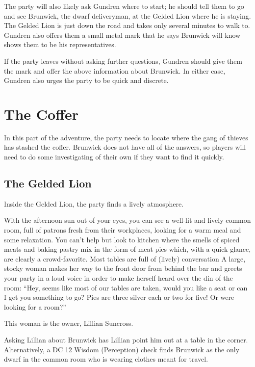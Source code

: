 \documentclass[10pt,twocolumn,openany,nodeprecatedcode,bg=none,inline]{dndbook}
\begin{document}
The party will also likely ask Gundren where to start; he should tell them to go and see Brunwick, the dwarf deliveryman, at the Gelded Lion where he is staying.
The Gelded Lion is just down the road and takes only several minutes to walk to.
Gundren also offers them a small metal mark that he says Brunwick will know shows them to be his representatives.

If the party leaves without asking further questions, Gundren should give them the mark and offer the above information about Brunwick.
In either case, Gundren also urges the party to be quick and discrete.

\chapter{The Coffer}
In this part of the adventure, the party needs to locate where the gang of thieves has stashed the coffer.
Brunwick does not have all of the answers, so players will need to do some investigating of their own if they want to find it quickly.

\section{The Gelded Lion}
Inside the Gelded Lion, the party finds a lively atmosphere.
\begin{DndReadAloud}
  With the afternoon sun out of your eyes, you can see a well-lit and lively common room, full of patrons fresh from their workplaces, looking for a warm meal and some relaxation.
  You can't help but look to kitchen where the smells of spiced meats and baking pastry mix in the form of meat pies which, with a quick glance, are clearly a crowd-favorite.
  Most tables are full of (lively) conversation
  A large, stocky woman makes her way to the front door from behind the bar and greets your party in a loud voice in order to make herself heard over the din of the room:
  ``Hey, seems like most of our tables are taken, would you like a seat or can I get you something to go?
  Pies are three silver each or two for five!
  Or were looking for a room?''
\end{DndReadAloud}

This woman is the owner, Lillian Suncross.

Asking Lillian about Brunwick has Lillian point him out at a table in the corner.
Alternatively, a DC 12 Wisdom (Perception) check finds Brunwick as the only dwarf in the common room who is wearing clothes meant for travel.
\end{document}
